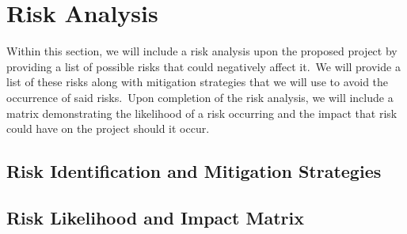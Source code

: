 \chapter{Risk Analysis} \label{ch:risk}

    Within this section, we will include a risk analysis upon the proposed project by providing a list of possible risks
    that could negatively affect it.\ We will provide a list of these risks along with mitigation strategies that we will
    use to avoid the occurrence of said risks.\ Upon completion of the risk analysis, we will include a matrix
    demonstrating the likelihood of a risk occurring and the impact that risk could have on the project should it occur.

	\section{Risk Identification and Mitigation Strategies}

    	\vspace{3em}  \vspace{6em}

	\section{Risk Likelihood and Impact Matrix}

		\vspace{3em} 
